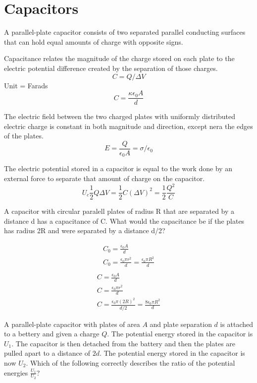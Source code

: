 \documentclass[../em.tex]{subfiles}
\begin{document}
\section{Capacitors}
A parallel-plate capacitor consists of two separated parallel conducting surfaces 
that can hold equal amounts of charge with opposite signs.

Capacitance relates the magnitude of the charge stored on each plate to the electric 
potential difference created by the separation of those charges.
\[C = Q/\Delta V\] 
Unit = Farads
\[C = \frac{\kappa \epsilon_0 A}{d}\]

The electric field between the two charged plates with uniformly distributed 
electric charge is constant in both magnitude and direction, except nera the edges of the plates.
\[E = \frac{Q}{\epsilon_0 A} = \sigma/\epsilon_0\]

The electric potential stored in a capacitor is equal to the work done by an external force 
to separate that amount of charge on the capacitor.
\[U_c \frac{1}{2}Q\Delta V = \frac{1}{2}C(\Delta V)^2 = \frac{1}{2}\frac{Q^2}{C}\]

\begin{example}
    A capacitor with circular paralell plates of radius R that are separated by a distance d 
    has a capacitance of C. What would the capacitance be if the plates has radius 2R and 
    were separated by a distance d/2?

    \begin{align*}
        C_0 = \frac{\epsilon_0 A}{d}\\ 
        C_0 = \frac{\epsilon_0\pi r^2}{d}=\frac{\epsilon_0 \pi R^2}{d}\\
    \end{align*}
    \begin{align*}
        C = \frac{\epsilon_0 A}{d}\\
        C = \frac{\epsilon_0 \pi r^2}{d}\\
        C = \frac{\epsilon_0 \pi (2R)^2}{d/2} = \frac{8\epsilon_0\pi R^2}{d}
    \end{align*}
\end{example}

\ex A parallel-plate capacitor with plates of area $A$ and plate separation $d$ is attached to a bettery and given a charge $Q$. The potential energy stored in the capacitor is $U_1$. The capacitor is then detached from the battery 
and then the plates are pulled apart to a distance of $2d$. The potential energy stored in the capacitor is now $U_2$. Which of the following correctly describes the ratio of the potential energies $\frac{U_1}{U_2}$?
\end{document}
